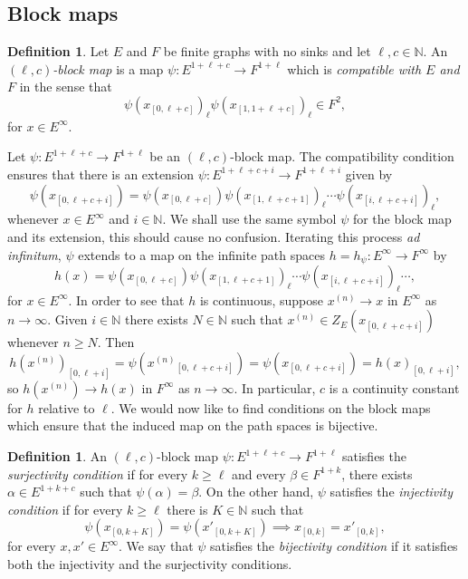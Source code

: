 \documentclass[12pt,a4paper,oneside,reqno,final]{amsart}
\newcommand{\LRA}{\longrightarrow}
\newcommand{\N}{\mathbb{N}}
\let\geq\geqslant{}
\theoremstyle{definition}
\newtheorem{definition}[lemma]{Definition}
\numberwithin{equation}{section} %
\begin{document}
\subsection{Block maps}

\begin{definition}
    Let $E$ and $F$ be finite graphs with no sinks and let $\ell, c\in \N$.
    An \emph{$(\ell, c)$-block map} is a map $\psi\colon E^{1 + \ell + c}\LRA F^{1 + \ell}$ which is \emph{compatible with $E$ and $F$}
    in the sense that 
    \[
        {\psi(x_{[0, \ell + c]})}_\ell {\psi(x_{[1, 1 + \ell + c]})}_{\ell}\in F^2,
    \]
    for $x\in E^{\infty}$.
\end{definition}

Let $\psi\colon E^{1 + \ell + c}\LRA F^{1 + \ell}$ be an $(\ell, c)$-block map.
The compatibility condition ensures that there is an extension $\psi\colon E^{1 + \ell + c + i} \LRA F^{1 + \ell + i}$ given by
\[
  \psi(x_{[0, \ell + c + i]}) = \psi(x_{[0, \ell + c]}) {\psi(x_{[1, \ell + c + 1]})}_\ell \cdots {\psi(x_{[i, \ell + c + i]})}_\ell,
\]
whenever $x\in E^\infty$ and $i\in \N$.
We shall use the same symbol $\psi$ for the block map and its extension, this should cause no confusion.
Iterating this process \emph{ad infinitum}, $\psi$ extends to a map on the infinite path spaces $h = h_\psi\colon E^\infty\LRA F^\infty$ by
\[
    h(x) = \psi(x_{[0, \ell + c]}) {\psi(x_{[1, \ell + c + 1]})}_\ell \cdots {\psi(x_{[i, \ell + c + i]})}_\ell \cdots,
\]
for $x\in E^\infty$.
In order to see that $h$ is continuous, suppose $x^{(n)}\LRA x$ in $E^\infty$ as $n\LRA \infty$.
Given $i\in \N$ there exists $N\in \N$ such that $x^{(n)}\in Z_E(x_{[0, \ell + c + i]})$ whenever $n\geq N$.
Then
\[
    {h(x^{(n)})}_{[0, \ell + i]} = \psi({x^{(n)}}_{[0, \ell + c + i]}) = \psi(x_{[0, \ell + c + i]}) = {h(x)}_{[0, \ell + i]},
\]
so $h(x^{(n)}) \LRA h(x)$ in $F^\infty$ as $n\LRA \infty$.
In particular, $c$ is a continuity constant for $h$ relative to $\ell$.
We would now like to find conditions on the block maps which ensure that the induced map on the path spaces is bijective.


\begin{definition}
    An $(\ell, c)$-block map $\psi\colon E^{1 + \ell + c}\LRA F^{1 + \ell}$ satisfies the \emph{surjectivity condition}
    if for every $k\geq \ell$ and every $\beta\in F^{1 + k}$, there exists $\alpha\in E^{1 + k + c}$ such that $\psi(\alpha) = \beta$.
    On the other hand, $\psi$ satisfies the \emph{injectivity condition} if for every $k\geq \ell$ there is $K\in \N$ such that
    \[
      \psi(x_{[0, k + K]}) = \psi(x'_{[0, k + K]}) \implies x_{[0, k]} = x'_{[0, k]},
    \]
    for every $x, x'\in E^\infty$.
    We say that $\psi$ satisfies the \emph{bijectivity condition} if it satisfies both the injectivity and the surjectivity conditions.
\end{definition}
\end{document}

